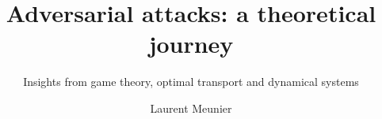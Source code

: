 \documentclass{mimosis}
\title{Adversarial attacks: a theoretical journey}
\subtitle{Insights from game theory, optimal transport and dynamical systems}
\author{Laurent Meunier}
\begin{document}
 

\frontmatter

% 

% 

\dominitoc
\tableofcontents

 \renewcommand\listfigurename{List of Figures and Tables}
 \listoffigures





\mainmatter






 
\appendix






\backmatter




\end{document}
